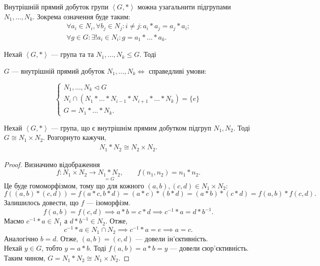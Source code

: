 \documentclass{math_library}
\begin{document}
\begin{remark}
Внутрішній прямий добуток групи $\left< G, *\right>$ можна узагальнити підгрупами $N_1,\dots,N_k$. Зокрема означення буде таким:
\begin{align*}
\forall a_i \in N_i, \forall b_j \in N_j: i \neq j: a_i*a_j = a_j*a_i; \\
\forall g \in G: \exists !a_i \in N_i: g = a_1 * \dots * a_k.
\end{align*}
\end{remark}

\begin{theorem}
Нехай $\left<G, *\right>$ --- група та та $N_1,\dots,N_k \leq G$. Тоді
\begin{center}
$G$ --- внутрішній прямий добуток $N_1,\dots,N_k \iff$ справедливі умови:
\end{center}
\begin{equation*}
\label{internal_product_bigger_than_2}
\begin{cases} N_1, \dots, N_k \triangleleft G \\ N_i \cap (N_1*\dots*N_{i-1}*N_{i+1}*\dots*N_k) = \{e\} \\ G = N_1*\dots*N_k. \end{cases}
\end{equation*}
\end{theorem}

\begin{theorem}
Нехай $\left< G, *\right>$ --- група, що є внутрішнім прямим добутком підгруп $N_1,N_2$. Тоді $G \cong N_1 \times N_2$. Розгорнуто кажучи, 
\begin{align*}
N_1 * N_2 \cong N_2 \times N_2.
\end{align*}
\end{theorem}

\begin{proof}
Визначимо відображення 
\[
f \colon N_1 \times N_2 \to \underset{=G}{N_1*N_2}, \qquad f(n_1,n_2) = n_1*n_2.
\]
Це буде гомоморфізмом, тому що для кожного $(a,b),(c,d) \in N_1 \times N_2:$
\[
f((a,b)*(c,d)) = f(a*c,b*d) = (a*c)*(b*d) = (a*b)*(c*d) = f(a,b)*f(c,d).
\]
Залишилось довести, що $f$ --- ізоморфізм.
\[
f(a,b)=f(c,d) \implies a*b = c*d \implies c^{-1}*a = d*b^{-1}.
\]
Маємо $c^{-1}*a \in N_1$ а $d*b^{-1} \in N_2$. Отже, 
\[
c^{-1}*a \in N_1 \cap N_2 \implies c^{-1}*a=e \implies a = c.
\] 
Аналогічно $b = d$. Отже, $(a,b) = (c,d)$ --- довели ін'єктивність.\\
Нехай $y \in G$, тобто $y = a*b$. Тоді $f(a,b) = a*b = y$ --- довели сюр'єктивність.\\
Таким чином, $G = N_1 * N_2 \cong N_1 \times N_2$.
\end{proof}
\end{document}
